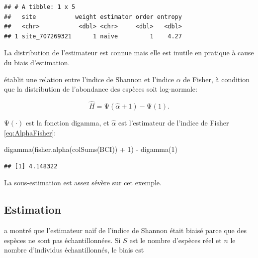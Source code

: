 \documentclass[
  11pt,
  american,
  a4paper,
  extrafontsizes,onecolumn,openright
  ]{memoir}
\newenvironment{Shaded}{\begin{snugshade}}{\end{snugshade}}
\newcommand{\DecValTok}[1]{\textcolor[rgb]{0.00,0.00,0.81}{#1}}
\newcommand{\FunctionTok}[1]{\textcolor[rgb]{0.00,0.00,0.00}{#1}}
\newcommand{\NormalTok}[1]{#1}
\newcommand{\SpecialCharTok}[1]{\textcolor[rgb]{0.00,0.00,0.00}{#1}}
\begin{document}
\begin{verbatim}
## # A tibble: 1 x 5
##   site           weight estimator order entropy
##   <chr>           <dbl> <chr>     <dbl>   <dbl>
## 1 site_707269321      1 naive         1    4.27
\end{verbatim}

\normalsize

La distribution de l'estimateur est connue \autocite{Hutcheson1970} mais elle est inutile en pratique à cause du biais d'estimation.

\textcite{Bulmer1974} établit une relation entre l'indice de Shannon et l'indice \(\alpha\) de Fisher, à condition que la distribution de l'abondance des espèces soit log-normale:

\begin{equation}
  \label{eq:Bulmer1974}
  \hat{H} 
  = \mathrm{\Psi} \left( \hat{\alpha} + 1 \right) - \mathrm{\Psi} \left( 1 \right).
\end{equation}

\(\mathrm{\Psi}(\cdot)\) est la fonction digamma, et \(\hat{\alpha}\) est l'estimateur de l'indice de Fisher \eqref{eq:AlphaFisher}:

\scriptsize

\begin{Shaded}
\begin{Highlighting}[]
\FunctionTok{digamma}\NormalTok{(}\FunctionTok{fisher.alpha}\NormalTok{(}\FunctionTok{colSums}\NormalTok{(BCI)) }\SpecialCharTok{+} \DecValTok{1}\NormalTok{) }\SpecialCharTok{{-}} \FunctionTok{digamma}\NormalTok{(}\DecValTok{1}\NormalTok{)}
\end{Highlighting}
\end{Shaded}

\begin{verbatim}
## [1] 4.148322
\end{verbatim}

\normalsize

La sous-estimation est assez sévère sur cet exemple.

\hypertarget{sec-BiaisShannon}{%
\subsection{Estimation}\label{sec-BiaisShannon}}

\textcite{Basharin1959} a montré que l'estimateur naïf de l'indice de Shannon était biaisé parce que des espèces ne sont pas échantillonnées.
Si \(S\) est le nombre d'espèces réel et \(n\) le nombre d'individus échantillonnés, le biais est
\end{document}
